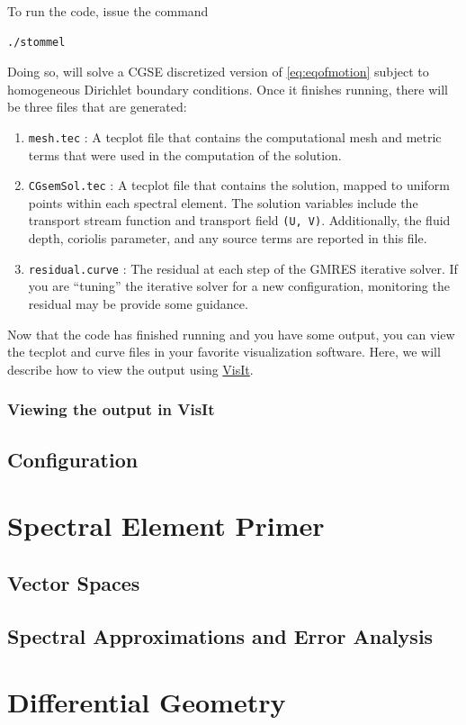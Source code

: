 \documentclass{softwaremanual}
\begin{document}
To run the code, issue the command
\begin{verbatim}
./stommel
\end{verbatim}
Doing so, will solve a CGSE discretized version of \eqref{eq:eqofmotion} subject to homogeneous Dirichlet boundary conditions. Once it finishes running, there will be three files that are generated:
\begin{enumerate}
\item \texttt{mesh.tec} : A tecplot file that contains the computational mesh and metric terms that were used in the computation of the solution.
\item \texttt{CGsemSol.tec} : A tecplot file that contains the solution, mapped to uniform points within each spectral element. The solution variables include the transport stream function and transport field \texttt{(U, V)}. Additionally, the fluid depth, coriolis parameter, and any source terms are reported in this file.
\item \texttt{residual.curve} : The residual at each step of the GMRES iterative solver. If you are ``tuning'' the iterative solver for a new configuration, monitoring the residual may be provide some guidance.
\end{enumerate}

Now that the code has finished running and you have some output, you can view the tecplot and curve files in your favorite visualization software. Here, we will describe how to view the output using \href{https://wci.llnl.gov/simulation/computer-codes/visit/}{VisIt}.

\subsection{Viewing the output in VisIt}
\section{Configuration}\label{sec:config}
\clearpage

\appendix

\chapter{Spectral Element Primer}

\section{Vector Spaces}


\section{Spectral Approximations and Error Analysis}

\chapter{Differential Geometry}\label{chap:GeometryTheory}

\pagebreak



\end{document}
